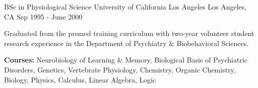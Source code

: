 \begin{cventries}
  \cventry
    {BSc in Physiological Science} %
    {University of California Los Angeles} %
    {Los Angeles, CA} %
    {Sep 1995 - June 2000} %
    {
      \begin{cvitems} %
        \item {Graduated from the premed training curriculum with two-year volunteer student research experience in the Department of Psychiatry \& Biobehavioral Sciences.}
        \item {\textbf{Courses:} Neurobiology of Learning \& Memory, Biological Basis of Psychiatric Disorders, Genetics, Vertebrate Physiology, Chemistry, Organic Chemistry, Biology, Physics, Calculus, Linear Algebra, Logic}
      \end{cvitems}
    }
\end{cventries}
